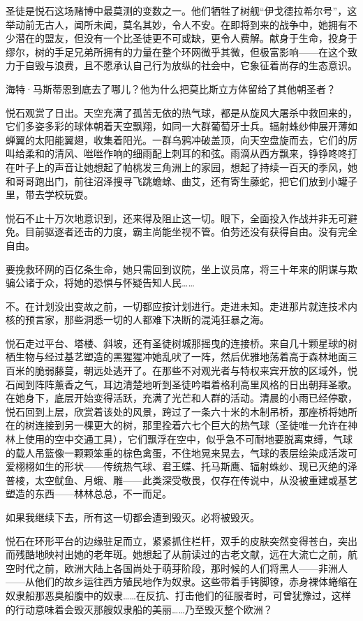 \documentclass[AutoFakeBold=true]{book}
\begin{document}
圣徒是悦石这场赌博中最莫测的变数之一。他们牺牲了树舰``伊戈德拉希尔号''，这举动前无古人，闻所未闻，莫名其妙，令人不安。在即将到来的战争中，她拥有不少潜在的盟友，但没有一个比圣徒更不可或缺，更令人费解。献身于生命，投身于缪尔，树的手足兄弟所拥有的力量在整个环网微乎其微，但极富影响——在这个致力于自毁与浪费，且不愿承认自己行为放纵的社会中，它象征着尚存的生态意识。

{\kaishu 海特·马斯蒂恩到底去了哪儿？他为什么把莫比斯立方体留给了其他朝圣者？}

悦石观赏了日出。天空充满了孤苦无依的热气球，都是从旋风大屠杀中救回来的，它们多姿多彩的球体朝着天空飘翔，如同一大群葡萄牙士兵。辐射蛛纱伸展开薄如蝉翼的太阳能翼翅，收集着阳光。一群乌鸦冲破盖顶，向天空盘旋而去，它们的厉叫给柔和的清风、咝咝作响的细雨配上刺耳的和弦。雨滴从西方飘来，铮铮咚咚打在叶子上的声音让她想起了帕桃发三角洲上的家园，想起了持续一百天的季风，她和哥哥跑出门，前往沼泽搜寻飞跳蟾蜍、曲艾，还有寄生藤蛇，把它们放到小罐子里，带去学校玩耍。

悦石不止十万次地意识到，还来得及阻止这一切。眼下，全面投入作战并非无可避免。目前驱逐者还击的力度，霸主尚能坐视不管。伯劳还没有获得自由。没有完全自由。

要挽救环网的百亿条生命，她只需回到议院，坐上议员席，将三十年来的阴谋与欺骗公诸于众，将她的恐惧与怀疑告知人民……

{\kaishu 不。在计划没出变故之前，一切都应按计划进行。走进未知。走进那片就连技术内核的预言家，那些洞悉一切的人都难下决断的混沌狂暴之海。}

悦石走过平台、塔楼、斜坡，还有圣徒树城那摇曳的连接桥。来自几十颗星球的树栖生物与经过基艺塑造的黑猩猩冲她乱吠了一阵，然后优雅地荡着高于森林地面三百米的脆弱藤蔓，朝远处逃开了。在那些不对观光者与特权来宾开放的区域外，悦石闻到阵阵薰香之气，耳边清楚地听到圣徒吟唱着格利高里风格的日出朝拜圣歌。在她身下，底层开始变得活跃，充满了光芒和人群的活动。清晨的小雨已经停歇，悦石回到上层，欣赏着该处的风景，跨过了一条六十米的木制吊桥，那座桥将她所在的树连接到另一棵更大的树，那里拴着六七个巨大的热气球（圣徒唯一允许在神林上使用的空中交通工具），它们飘浮在空中，似乎急不可耐地要脱离束缚，气球的载人吊篮像一颗颗笨重的棕色禽蛋，不住地晃来晃去，气球的表层绘染成活泼可爱栩栩如生的形状——传统热气球、君王蝶、托马斯鹰、辐射蛛纱、现已灭绝的泽普棱，太空鱿鱼、月蛾、雕——此类深受敬畏，仅存在传说中，从没被重建或基艺塑造的东西——林林总总，不一而足。

{\kaishu 如果我继续下去，所有这一切都会遭到毁灭。必将被毁灭。}

悦石在环形平台的边缘驻足而立，紧紧抓住栏杆，双手的皮肤突然变得苍白，突出而残酷地映衬出她的老年斑。她想起了从前读过的古老文献，远在大流亡之前，航空时代之前，欧洲大陆上各国尚处于萌芽阶段，那时候的人们将黑人——非洲人——从他们的故乡运往西方殖民地作为奴隶。这些带着手铐脚镣，赤身裸体蜷缩在奴隶船那恶臭船腹中的奴隶……在反抗、打击他们的征服者时，可曾犹豫过，这样的行动意味着会毁灭那艘奴隶船的美丽……乃至毁灭整个欧洲？
\end{document}
